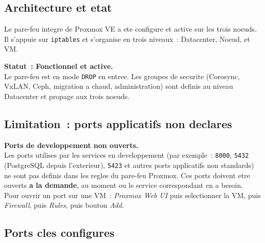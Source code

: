 \documentclass[a4paper,11pt]{article}
\newenvironment{warnbox}{%
  \begin{mdframed}[linecolor=orange,backgroundcolor=orange!8,linewidth=1pt,
    leftmargin=0pt,rightmargin=0pt,innertopmargin=6pt,innerbottommargin=6pt]
}{%
  \end{mdframed}
}
\newenvironment{successbox}{%
  \begin{mdframed}[linecolor=vert,backgroundcolor=vert!7,linewidth=1pt,
    leftmargin=0pt,rightmargin=0pt,innertopmargin=6pt,innerbottommargin=6pt]
}{%
  \end{mdframed}
}
\begin{document}
\subsection{Architecture et etat}

Le pare-feu integre de Proxmox VE a ete configure et active sur les trois noeuds.
Il s'appuie sur \texttt{iptables} et s'organise en trois niveaux~: Datacenter, Noeud, et VM.

\begin{successbox}
  \textbf{Statut~: Fonctionnel et active.}\\
  Le pare-feu est en mode \texttt{DROP} en entree. Les groupes de securite
  (Corosync, VxLAN, Ceph, migration a chaud, administration) sont definis
  au niveau Datacenter et propage aux trois noeuds.
\end{successbox}

\subsection{Limitation~: ports applicatifs non declares}

\begin{warnbox}
  \textbf{Ports de developpement non ouverts.}\\
  Les ports utilises par les services en developpement (par exemple~: \texttt{8000},
  \texttt{5432} (PostgreSQL depuis l'exterieur), \texttt{5423} et autres ports applicatifs
  non standards) ne sont pas definis dans les regles du pare-feu Proxmox. Ces ports doivent
  etre ouverts \textbf{a la demande}, au moment ou le service correspondant en a besoin.\\[0.3em]
  Pour ouvrir un port sur une VM~: \textit{Proxmox Web UI} puis
  selectionner la VM, puis \textit{Firewall}, puis \textit{Rules}, puis bouton \textit{Add}.
\end{warnbox}

\subsection{Ports cles configures}
\end{document}
